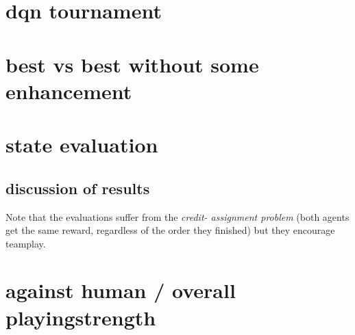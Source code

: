 \section{dqn tournament}
\section{best vs best without some enhancement}
\section{state evaluation}
\label{sec:evaluationexp}
\subsection{discussion of results}
Note that the evaluations suffer from the \textit{credit- assignment problem} (both agents get the same reward, regardless of the order they finished) but they encourage teamplay.


\section{against human / overall playingstrength}
